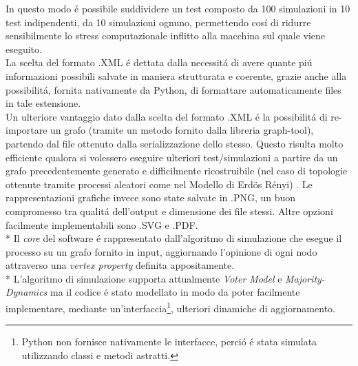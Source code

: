 \documentclass[../Tesi.tex]{subfiles}
\begin{document}
In questo modo \'e possibile suddividere un test composto da 100 simulazioni in 10 test indipendenti, da 10 simulazioni ognuno, permettendo cos\'i di ridurre sensibilmente lo stress computazionale inflitto alla macchina sul quale viene eseguito.\\
La scelta del formato .XML \'e dettata dalla necessit\'a di avere quante pi\'u informazioni possibili salvate in maniera strutturata e coerente, grazie anche alla possibilit\'a, fornita nativamente da Python, di formattare automaticamente files in tale estensione.\\
Un ulteriore vantaggio dato dalla scelta del formato .XML \'e la possibilit\'a di re-importare un grafo (tramite un metodo fornito dalla libreria graph-tool), partendo dal file ottenuto dalla serializzazione dello stesso. Questo risulta molto efficiente qualora si volessero eseguire ulteriori test/simulazioni a partire da un grafo precedentemente generato e difficilmente ricostruibile (nel caso di topologie ottenute tramite processi aleatori come nel Modello di Erd{\"o}s R\'enyi) \cite{Erdos:1959:pmd}.
Le rappresentazioni grafiche invece sono state salvate in .PNG, un buon compromesso tra qualit\'a dell'output e dimensione dei file stessi. Altre opzioni facilmente implementabili sono .SVG e .PDF.\\*
Il \emph{core} del software \'e rappresentato dall'algoritmo di simulazione che esegue il processo su un grafo fornito in input, aggiornando l'opinione di ogni nodo attraverso una \emph{vertex property} definita appositamente.\\*
L'algoritmo di simulazione supporta attualmente \emph{Voter Model} e \emph{Majority-Dynamics} ma il codice \'e stato modellato in modo da poter facilmente implementare, mediante un'interfaccia\footnote{Python non fornisce nativamente le interfacce, perci\'o \'e stata simulata utilizzando classi e metodi astratti.}, ulteriori dinamiche di aggiornamento.
\end{document}
